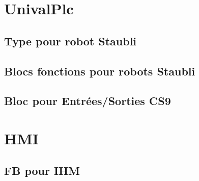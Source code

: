 
\section{UnivalPlc}
\subsection{Type pour robot Staubli}

\pagebreak
\subsection{Blocs fonctions pour robots Staubli}

\subsection{Bloc pour Entrées/Sorties CS9}
\label{annexe:CS9IO}

\section{HMI}
\subsection{FB pour IHM}
